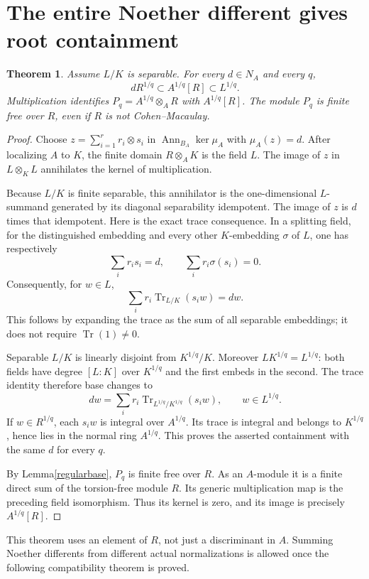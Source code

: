 \documentclass[11pt]{article}
\newtheorem{theorem}{Theorem}
\newcommand{\Ann}{\operatorname{Ann}}
\newcommand{\Tr}{\operatorname{Tr}}
\begin{document}
\section{The entire Noether different gives root containment}
\begin{theorem}\label{rootcontainment}
Assume $L/K$ is separable. For every $d\in N_A$ and every $q$,
\[
 dR^{1/q}\subset A^{1/q}[R]\subset L^{1/q}.
\]
Multiplication identifies $P_q=A^{1/q}\otimes_A R$ with $A^{1/q}[R]$.
The module $P_q$ is finite free over $R$, even if $R$ is not
Cohen--Macaulay.
\end{theorem}
\begin{proof}
Choose $z=\sum_{i=1}^r r_i\otimes s_i$ in
$\Ann_{B_A}\ker\mu_A$ with $\mu_A(z)=d$. After localizing $A$ to $K$,
the finite domain $R\otimes_A K$ is the field $L$. The image of $z$ in
$L\otimes_K L$ annihilates the kernel of multiplication.

Because $L/K$ is finite separable, this annihilator is the one-dimensional
$L$-summand generated by its diagonal separability idempotent. The image
of $z$ is $d$ times that idempotent. Here is the exact trace consequence.
In a splitting field, for the distinguished embedding and every other
$K$-embedding $\sigma$ of $L$, one has respectively
\[
 \sum_i r_i s_i=d,\qquad \sum_i r_i\sigma(s_i)=0.
\]
Consequently, for $w\in L$,
\[
 \sum_i r_i\Tr_{L/K}(s_iw)=dw.
\]
This follows by expanding the trace as the sum of all separable embeddings;
it does not require $\Tr(1)\ne0$.

Separable $L/K$ is linearly disjoint from $K^{1/q}/K$.
Moreover $LK^{1/q}=L^{1/q}$: both fields have degree $[L:K]$ over
$K^{1/q}$ and the first embeds in the second. The trace identity therefore
base changes to
\[
 dw=\sum_i r_i\Tr_{L^{1/q}/K^{1/q}}(s_iw),\qquad w\in L^{1/q}.
\]
If $w\in R^{1/q}$, each $s_iw$ is integral over $A^{1/q}$. Its trace is
integral and belongs to $K^{1/q}$, hence lies in the normal ring $A^{1/q}$.
This proves the asserted containment with the same $d$ for every $q$.

By Lemma\ref{regularbase}, $P_q$ is finite free over $R$. As an
$A$-module it is a finite direct sum of the torsion-free module $R$.
Its generic multiplication map is the preceding field isomorphism.
Thus its kernel is zero, and its image is precisely $A^{1/q}[R]$.
\end{proof}
This theorem uses an element of $R$, not just a discriminant in $A$.
Summing Noether differents from different actual normalizations is allowed
once the following compatibility theorem is proved.
\end{document}
